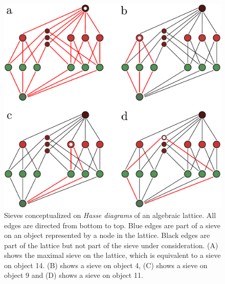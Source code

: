 \begin{frame}
\begin{figure}
\noindent\includegraphics[width=0.4\framewidth]{fig/sieveHasseNoNum.pdf}
\caption{Sieves conceptualized on {\it Hasse diagrams} of an algebraic lattice. All edges are directed from bottom to top. Blue edges are part of a sieve on an object represented by a node in the lattice. Black edges are part of the lattice but not part of the sieve under consideration. (A) shows the maximal sieve on the lattice, which is equivalent to a sieve on object 14. (B) shows a sieve on object 4, (C) shows a sieve on object 9 and (D) shows a sieve on object 11.}
\label{fig:sieve}
\end{figure}
\end{frame}
